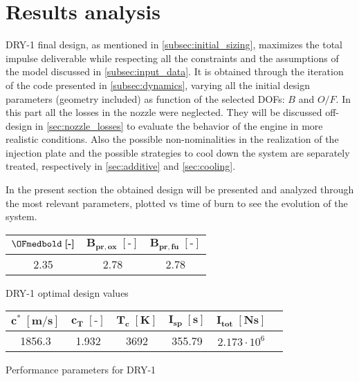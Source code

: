 \section{Results analysis}
\label{sec:results}

DRY-1 final design, as mentioned in \autoref{subsec:initial_sizing}, maximizes the total impulse deliverable while respecting all the constraints and the assumptions of the model discussed in \autoref{subsec:input_data}.
It is obtained through the iteration of the code presented in \autoref{subsec:dynamics}, varying all the initial design parameters (geometry included) as function of the selected DOFs: $B$ and $O/F$.
In this part all the losses in the nozzle were neglected. They will be discussed off-design in \autoref{sec:nozzle_losses} to evaluate the behavior of the engine in more realistic conditions.
Also the possible non-nominalities in the realization of the injection plate and the possible strategies to cool down the system are separately treated, respectively in \autoref{sec:additive} and \autoref{sec:cooling}.

In the present section the obtained design will be presented and analyzed through the most relevant parameters, plotted vs time of burn to see the evolution of the system.

\vspace*{5mm}

\begin{minipage}{0.4\linewidth}
    \centering
    \small
    \captionsetup{type=table}
    \renewcommand{\arraystretch}{1.4}
    \begin{tabular}{|c|c|c|}
        \hline
        $\OFmedbold \; \boldsymbol{[\textbf{-}]}$   &
        $\boldsymbol{B_{pr,ox} \; [\textbf{-}]}$    &
        $\boldsymbol{B_{pr,fu} \; [\textbf{-}]}$    \\
        \hline
        \hline
        2.35 & 2.78 & 2.78 \\
        \hline
    \end{tabular}
    \caption{DRY-1 optimal design values}
    \label{table:OF_B_final}
\end{minipage}\hfill
\begin{minipage}{0.6\linewidth}
    \centering
    \small
    \captionsetup{type=table}
    \renewcommand{\arraystretch}{1.4}
    \begin{tabular}{|c|c|c|c|c|c|}
        \hline
        $\boldsymbol{c^* \; [\textbf{m/s}]}$        &
        $\boldsymbol{c_T \; [\textbf{-}]}$          &
        $\boldsymbol{T_c \; [\textbf{K}]}$          &
        $\boldsymbol{I_{sp} \; [\textbf{s}]}$       &
        $\boldsymbol{I_{tot} \; [\textbf{Ns}]}$     \\
        \hline
        \hline
        1856.3 & 1.932 & 3692 & 355.79 & $2.173 \cdot 10^6$ \\
        \hline
    \end{tabular}
    \caption{Performance parameters for DRY-1}
    \label{table:performance_values}
\end{minipage} 

